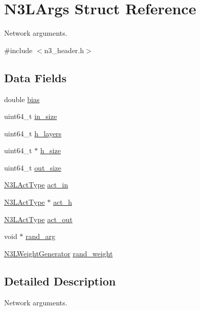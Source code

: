 \hypertarget{structN3LArgs}{}\section{N3\+L\+Args Struct Reference}
\label{structN3LArgs}


Network arguments.  




{\ttfamily \#include $<$n3\+\_\+header.\+h$>$}

\subsection*{Data Fields}
\begin{DoxyCompactItemize}
\item 
double \hyperlink{structN3LArgs_ad51d108eba4b55f7fc49174724fbacad}{bias}
\item 
uint64\+\_\+t \hyperlink{structN3LArgs_afbd19ab7f7afe11e440f46d293a0f6dc}{in\+\_\+size}
\item 
uint64\+\_\+t \hyperlink{structN3LArgs_acbb947695cd6db88658a2a6fa78c1682}{h\+\_\+layers}
\item 
uint64\+\_\+t $\ast$ \hyperlink{structN3LArgs_ae875ef755586a29387def48249c98d81}{h\+\_\+size}
\item 
uint64\+\_\+t \hyperlink{structN3LArgs_a63bb20896b0af109ea281998e5fd56ab}{out\+\_\+size}
\item 
\hyperlink{n3__header_8h_a3118e8995213ca26bd388c3d94cd8056}{N3\+L\+Act\+Type} \hyperlink{structN3LArgs_abb810a671b7a1b20c161e81e309f843c}{act\+\_\+in}
\item 
\hyperlink{n3__header_8h_a3118e8995213ca26bd388c3d94cd8056}{N3\+L\+Act\+Type} $\ast$ \hyperlink{structN3LArgs_a968aa1ed194fc7bbfaac154bcbf8a405}{act\+\_\+h}
\item 
\hyperlink{n3__header_8h_a3118e8995213ca26bd388c3d94cd8056}{N3\+L\+Act\+Type} \hyperlink{structN3LArgs_ad9d17026b32668acea535143809b16c5}{act\+\_\+out}
\item 
void $\ast$ \hyperlink{structN3LArgs_a9df79247b5160e5261683a535654cc18}{rand\+\_\+arg}
\item 
\hyperlink{n3__header_8h_ab3b7d8e984e9ad2e4d5e7cbe433ad572}{N3\+L\+Weight\+Generator} \hyperlink{structN3LArgs_ac6f4a8939deb104e8b154860904f3b45}{rand\+\_\+weight}
\end{DoxyCompactItemize}


\subsection{Detailed Description}
Network arguments. 


